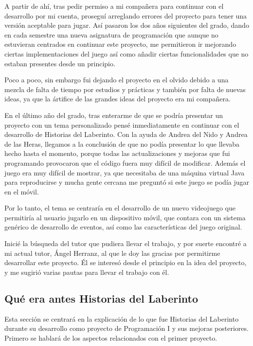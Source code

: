 \documentclass[12pt]{article}
\begin{document}
A partir de ahí, tras pedir permiso a mi compañera para continuar con el desarrollo por mi cuenta, proseguí arreglando errores del proyecto para tener una versión aceptable para jugar.
Así pasaron los dos años siguientes del grado, dando en cada semestre una nueva asignatura de programación que aunque no estuvieran centrados en continuar este proyecto, me permitieron ir mejorando ciertas implementaciones del juego así como añadir ciertas funcionalidades que no estaban presentes desde un principio.

Poco a poco, sin embargo fui dejando el proyecto en el olvido debido a una mezcla de falta de tiempo por estudios y prácticas y también por falta de nuevas ideas, ya que la ártifice de las grandes ideas del proyecto era mi compañera.

En el último año del grado, tras enterarme de que se podría presentar un proyecto con un tema personalizado pensé inmediatamente en continuar con el desarrollo de Historias del Laberinto.
Con la ayuda de Andrea del Nido y Andrea de las Heras, llegamos a la conclusión de que no podía presentar lo que llevaba hecho hasta el momento, porque todas las actualizaciones y mejoras que fui programando provocaron que el código fuera muy difícil de modificar.
Además el juego era muy difícil de mostrar, ya que necesitaba de una máquina virtual Java para reproducirse y mucha gente cercana me preguntó si este juego se podía jugar en el móvil.

Por lo tanto, el tema se centraría en el desarrollo de un nuevo videojuego que permitiría al usuario jugarlo en un dispositivo móvil, que contara con un sistema genérico de desarrollo de eventos, así como las características del juego original.

Inicié la búsqueda del tutor que pudiera llevar el trabajo, y por suerte encontré a mi actual tutor, Ángel Herranz, al que le doy las gracias por permitirme desarrollar este proyecto.
Él se interesó desde el principio en la idea del proyecto, y me sugirió varias pautas para llevar el trabajo con él.

\newpage
\subsection{Qué era antes Historias del Laberinto}
\onehalfspace

Esta sección se centrará en la explicación de lo que fue Historias del Laberinto durante su desarrollo como proyecto de Programación I y sus mejoras posteriores.
Primero se hablará de los aspectos relacionados con el primer proyecto.
\end{document}
